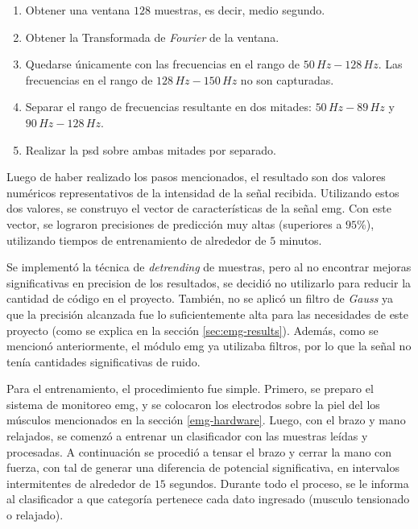  \begin{enumerate}
 \item Obtener una ventana $128$ muestras, es decir, medio segundo.
 \item Obtener la Transformada de \emph{Fourier} de la ventana.
 \item Quedarse únicamente con las frecuencias en el rango de $50 \, Hz-128 \, Hz$. Las frecuencias en el rango de $128 \, Hz-150 \, Hz$ no son capturadas.
 \item Separar el rango de frecuencias resultante en dos mitades: $50 \, Hz-89 \, Hz$ y $90 \, Hz-128 \, Hz$.
 \item Realizar la \acrshort{psd} sobre ambas mitades por separado.
 \end{enumerate}

Luego de haber realizado los pasos mencionados, el resultado son dos valores numéricos representativos de la intensidad de la señal recibida.  Utilizando estos dos valores, se construyo el vector de características de la señal \acrshort{emg}. Con este vector, se lograron precisiones de predicción muy altas (superiores a $ 95 \%$), utilizando tiempos de entrenamiento de alrededor de $5$ minutos.

Se implementó la técnica de \emph{detrending} de muestras, pero al no encontrar mejoras significativas en precision de los resultados, se decidió no utilizarlo para reducir la cantidad de código en el proyecto. También, no se aplicó un filtro de \emph{Gauss} ya que la precisión alcanzada fue lo suficientemente alta para las necesidades de este proyecto (como se explica en la sección \ref{sec:emg-results}). Además, como se mencionó anteriormente, el módulo \acrshort{emg} ya utilizaba filtros, por lo que la señal no tenía cantidades significativas de ruido.

Para el entrenamiento, el procedimiento fue simple. Primero, se preparo el sistema de monitoreo \acrshort{emg}, y se colocaron los electrodos sobre la piel del los músculos mencionados en la sección \ref{emg-hardware}. Luego, con el brazo y mano relajados, se comenzó a entrenar un clasificador con las muestras leídas y procesadas. A continuación se procedió a tensar el brazo y cerrar la mano con fuerza, con tal de generar una diferencia de potencial significativa, en intervalos intermitentes de alrededor de $15$ segundos. Durante todo el proceso, se le informa al clasificador a que categoría pertenece cada dato ingresado (musculo tensionado o relajado).

